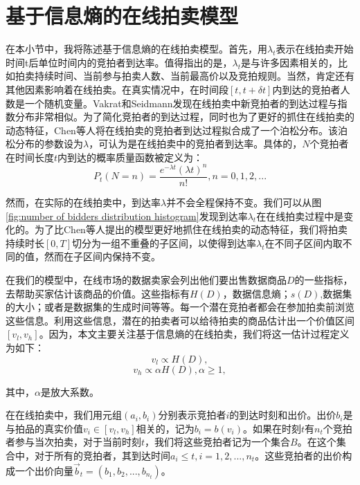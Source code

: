 \section{基于信息熵的在线拍卖模型}
在本小节中，我将陈述基于信息熵的在线拍卖模型。首先，用$\lambda_t$表示在线拍卖开始时间t后单位时间内的竞拍者到达率。值得指出的是，$\lambda_t$是与许多因素相关的，比如拍卖持续时间、当前参与拍卖人数、当前最高价以及竞拍规则。当然，肯定还有其他因素影响着在线拍卖。在真实情况中，在时间段$[t,t+\delta t]$内到达的竞拍者人数是一个随机变量。Vakrat和Seidmann\cite{Vakrat2000Implications}发现在线拍卖中新竞拍者的到达过程与指数分布非常相似。为了简化竞拍者的到达过程，同时也为了更好的抓住在线拍卖的动态特征，Chen等人\cite{Chen2007Optimal}将在线拍卖的竞拍者到达过程拟合成了一个泊松分布。该泊松分布的参数设为$\lambda$，可认为是在线拍卖中的竞拍者到达率。具体的，$N$个竞拍者在时间长度$t$内到达的概率质量函数被定义为：
\begin{equation}
\label{eq:number of bidder}
P_t(N=n)=\frac{e^{-\lambda t}(\lambda t)^n}{n!},n=0,1,2,...
\end{equation}

然而，在实际的在线拍卖中，到达率$\lambda$并不会全程保持不变。我们可以从图\ref{fig:number of bidders distribution histogram}发现到达率$\lambda_t$在在线拍卖过程中是变化的。为了比Chen等人提出的模型更好地抓住在线拍卖的动态特征，我们将拍卖持续时长$[0,T]$切分为一组不重叠的子区间，以使得到达率$\lambda_t$在不同子区间内取不同的值，然而在子区间内保持不变。

在我们的模型中，在线市场的数据卖家会列出他们要出售数据商品$D$的一些指标，去帮助买家估计该商品的价值。这些指标有$H(D)$，数据信息熵\cite{li2017first}；$s(D)$,数据集的大小；或者是数据集的生成时间等等。每一个潜在竞拍者都会在参加拍卖前浏览这些信息。利用这些信息，潜在的拍卖者可以给待拍卖的商品估计出一个价值区间$[v_l,v_h]$。因为，本文主要关注基于信息熵的在线拍卖，我们将这一估计过程定义为如下：
\begin{equation}
\label{eq:v_l}
v_l \propto H(D),
\end{equation}
\begin{equation}
\label{eq:v_h}
v_h \propto\alpha H(D),\alpha\ge 1,
\end{equation}

其中，$\alpha$是放大系数。

在在线拍卖中，我们用元组$(a_i,b_i)$分别表示竞拍者$i$的到达时刻和出价。出价$b_i$是与拍品的真实价值$v_i \in [v_l,v_h]$相关的，记为$b_i=b(v_i)$。如果在时刻$t$有$n_t$个竞拍者参与当次拍卖，对于当前时刻$t$，我们将这些竞拍者记为一个集合$B$。在这个集合中，对于所有的竞拍者，其到达时间$a_i \le t, i=1,2,...,n_t$。这些竞拍者的出价构成一个出价向量$\vec{b}_t=(b_1,b_2,...,b_{n_t})$。

